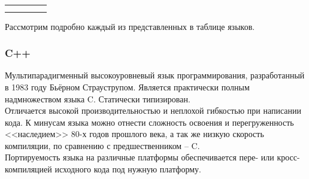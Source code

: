 \begin{table}
{\begin{longtable}{*{5}{| c}|}
                 & 
                 &
                 &
                 \\
            \hline
                 & 
                 & 
                 &
                 &
                 \\
            \hline
                 & 
                 & 
                 &
                 &
                 \\
            \hline
        \end{longtable}
    }
\end{table}

Рассмотрим подробно каждый из представленных в таблице языков.

\subsubsection{C++}\label{sec:ch2/sec1/sub1/sub1}
Мультипарадигменный высокоуровневый язык программирования,
разработанный в 1983 году Бьёрном Страуструпом. Является практически
полным надмножеством языка C. Статически типизирован.\\
Отличается высокой производительностью и неплохой гибкостью при написании кода.
К минусам языка можно отнести сложность освоения и перегруженность 
<<наследием>> 80-х годов прошлого века, а так же низкую скорость компиляции,
по сравнению с предшественником -- C.\\
Портируемость языка на различные платформы обеспечивается пере- или
кросс-компиляцией исходного кода под нужную платформу.



